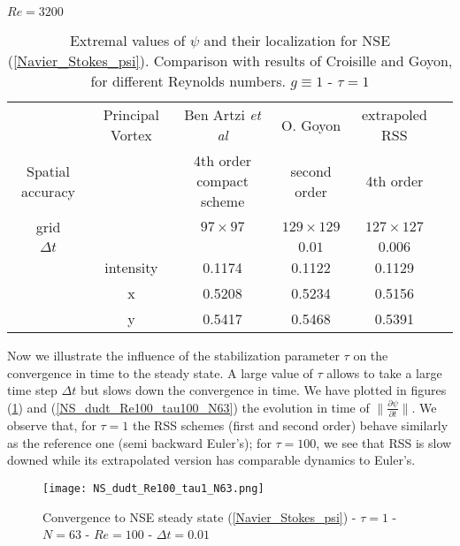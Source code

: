\documentclass[11pt]{article}
\begin{document}
{\begin{table}[!h]
\begin{center}
\vspace{0.5cm}

$Re=3200$

\begin{tabular}{| c|c|c|c|c|c | }
\hline 
 & Principal Vortex  & Ben Artzi {\it et al} \cite{BenArtziCroisille} & O. Goyon \cite{Goyon} & extrapoled RSS \\ 
Spatial accuracy &                  & 4th order compact scheme                        & second order      &   4th order          \\
\hline 
grid &   & $97 \times 97$ & $ 129 \times 129$ & $127 \times 127$ \\ 
\hline
$\Delta t$ & & &$0.01$ & $0.006$\\ 
\hline
&intensity  & 0.1174 & 0.1122 & 0.1129 \\ 

  & x & 0.5208 & 0.5234 & 0.5156 \\ 

  & y & 0.5417 & 0.5468 & 0.5391 \\ 
\hline 
\end{tabular} 
\caption{Extremal values of  $\psi$ and their localization for NSE (\ref{Navier_Stokes_psi}). Comparison with results of Croisille and Goyon, for different Reynolds numbers. $g \equiv 1$ - $\tau = 1$}
\label{Vortex}
\end{center}
\end{table}


Now we illustrate the influence of the stabilization parameter $\tau$ on the convergence in time to the steady state.
A large value of $\tau$ allows to take a large time step $\Delta t$ but slows down the convergence in time.
We have plotted in figures  (\ref{NS_dudt_Re100_tau1_N63}) and (\ref{NS_dudt_Re100_tau100_N63})  the evolution in time of $\| \frac{\partial \psi}{\partial t} \|$. We observe that, for $\tau=1$ the RSS schemes (first and second order) behave similarly as the reference one (semi backward Euler's); for $\tau =100$, we see that RSS is slow downed while its extrapolated version has comparable dynamics to Euler's.

\begin{figure}[!h]
\begin{center}
\texttt{[image: NS\_dudt\_Re100\_tau1\_N63.png]}
\caption{Convergence to NSE steady state (\ref{Navier_Stokes_psi}) - $\tau = 1$ -  $N=63$ - $Re = 100$ - $\Delta t = 0.01$}
\label{NS_dudt_Re100_tau1_N63}
\end{center}
\end{figure}

}
\end{document}
